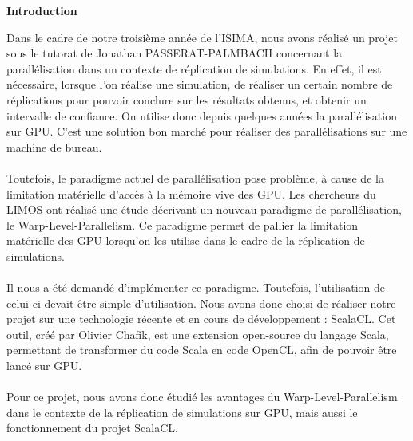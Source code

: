 \documentclass[a4paper,11pt]{report}
\renewcommand{\thepage}{}
\begin{document}
\newpage


\tableofcontents


\newpage

\renewcommand{\thepage}{\arabic{page}}
\setcounter{page}{1}

\begin{flushleft}
\LARGE{ \bf {Introduction}\bigskip}
\end{flushleft}

\normalsize{
	Dans le cadre de notre troisième année de l'ISIMA, nous avons réalisé un projet sous le tutorat de Jonathan \textsc{PASSERAT-PALMBACH} concernant la parallélisation dans un contexte de réplication de simulations. En effet, il est nécessaire, lorsque l'on réalise une simulation, de réaliser un certain nombre de réplications pour pouvoir conclure sur les résultats obtenus, et obtenir un intervalle de confiance.
On utilise donc depuis quelques années la parallélisation sur GPU. C'est une solution bon marché pour réaliser des parallélisations sur une machine de bureau.
}
\\ \\

\normalsize{
Toutefois, le paradigme actuel de parallélisation pose problème, à cause de la limitation matérielle d'accès à la mémoire vive des GPU.
Les chercheurs du LIMOS ont réalisé une étude décrivant un nouveau paradigme de parallélisation, le Warp-Level-Parallelism. Ce paradigme permet de pallier la limitation matérielle des GPU lorsqu'on les utilise dans le cadre de la réplication de simulations.
}
\\ \\

\normalsize{
Il nous a été demandé d'implémenter ce paradigme. Toutefois, l'utilisation de celui-ci devait être simple d'utilisation. Nous avons donc choisi de réaliser notre projet sur une technologie récente et en cours de développement : ScalaCL. Cet outil, créé par Olivier Chafik, est une extension open-source du langage Scala, permettant de transformer du code Scala en code OpenCL, afin de pouvoir être lancé sur GPU.  
}
\\ \\

\normalsize{
Pour ce projet, nous avons donc étudié les avantages du Warp-Level-Parallelism dans le contexte de la réplication de simulations sur GPU, mais aussi le fonctionnement du projet ScalaCL.
}
\\ \\
\end{document}

